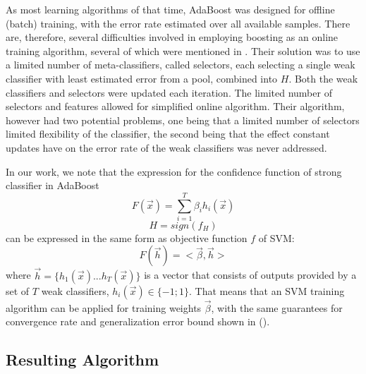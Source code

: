 \documentclass[10pt,twocolumn, a4paper]{article}
\begin{document}
As most learning algorithms of that time, AdaBoost was designed for offline (batch) training, with the error rate estimated over all available samples. There are, therefore, several difficulties involved in employing boosting as an online training algorithm, several of which were mentioned in \cite{OnlineBoost}. Their solution was to use a limited number of meta-classifiers, called selectors, each selecting a single weak classifier with least estimated error from a pool, combined into $H$. Both the weak classifiers and selectors were updated each iteration. The limited number of selectors and features allowed for simplified online algorithm.  Their algorithm, however had two potential problems, one being that a limited number of selectors limited flexibility of the classifier, the second being that the effect constant updates have on the error rate of the weak classifiers was never addressed. 

In our work, we note that the expression for the confidence function of strong classifier in AdaBoost
\begin{equation}
\label{StClConf}
F(\vec{x})=\sum_{i=1}^{T}{\beta_i h_i(\vec{x})}
\end{equation}
\begin{equation}
\label{StrongClassifier}
H=sign(f_H)
\end{equation}
can be expressed in the same form as objective function $f$ of SVM:
\begin{equation}
\label{StClConf1}
F(\vec{h})=<\vec{\beta},\vec{h}>
\end{equation}
where $\vec{h}=\{h_1(\vec{x})...h_T(\vec{x})\}$ is a vector that consists of outputs provided by a set of $T$ weak classifiers, $h_i(\vec{x})\in\{-1;1\}$. That means that an SVM training algorithm can be applied for training weights $\vec{\beta}$, with the same guarantees for convergence rate and generalization error bound shown in (\cite{Vapnik}).
\subsection{Resulting Algorithm}
\end{document}
